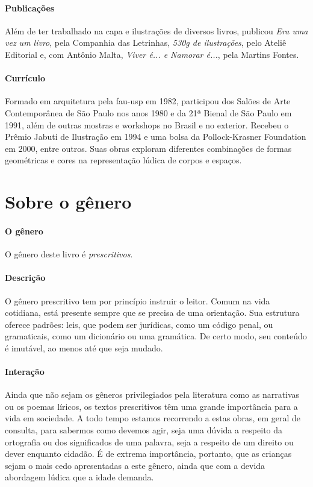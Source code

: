 \documentclass[11pt]{extarticle}
\begin{document}
\paragraph{Publicações} 
Além de ter trabalhado na capa e ilustrações de diversos livros, 
publicou \emph{Era uma vez um livro}, pela Companhia das Letrinhas, \emph{530g de ilustrações}, pelo Ateliê Editorial e, com Antônio Malta, \emph{Viver é... e Namorar é...}, pela Martins Fontes.
\paragraph{Currículo} 
Formado em arquitetura pela fau-usp em 1982, participou dos Salões de Arte 
Contemporânea de São Paulo nos anos 1980 e da 21ª Bienal de São Paulo em 1991, 
além de outras mostras e workshops no Brasil e no exterior. Recebeu o Prêmio 
Jabuti de Ilustração em 1994 e uma bolsa da Pollock-Krasner Foundation em 2000, 
entre outros. Suas obras exploram diferentes combinações de formas geométricas 
e cores na representação lúdica de corpos e espaços.


\section{Sobre o gênero}

\paragraph{O gênero} O gênero deste livro é \textit{prescritivos}. 


\paragraph{Descrição} 
O gênero prescritivo tem por princípio instruir o leitor. Comum na vida cotidiana, está presente sempre que se precisa de uma orientação. Sua estrutura oferece padrões: leis, que podem ser jurídicas, como um código penal, ou gramaticais, como um dicionário ou uma gramática. De certo modo, seu conteúdo é imutável, ao menos até que seja mudado.

\paragraph{Interação} 
Ainda que não sejam os gêneros privilegiados pela literatura
como as narrativas ou os poemas líricos, os textos prescritivos
têm uma grande importância para a vida em sociedade. A todo 
tempo estamos recorrendo a estas obras, em geral de consulta, para
sabermos como devemos agir, seja uma dúvida a respeito da ortografia ou 
dos significados de uma palavra, seja a respeito de um direito ou dever
enquanto cidadão. É de extrema importância, portanto, que as crianças
sejam o mais cedo apresentadas a este gênero, ainda que com a 
devida abordagem lúdica que a idade demanda. 
\end{document}
